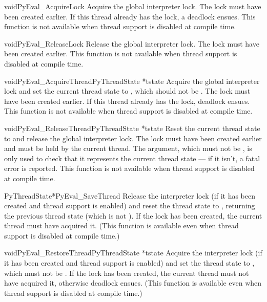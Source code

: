 \begin{cfuncdesc}{void}{PyEval_AcquireLock}{}
  Acquire the global interpreter lock.  The lock must have been
  created earlier.  If this thread already has the lock, a deadlock
  ensues.  This function is not available when thread support is
  disabled at compile time.
\end{cfuncdesc}

\begin{cfuncdesc}{void}{PyEval_ReleaseLock}{}
  Release the global interpreter lock.  The lock must have been
  created earlier.  This function is not available when thread support
  is disabled at compile time.
\end{cfuncdesc}

\begin{cfuncdesc}{void}{PyEval_AcquireThread}{PyThreadState *tstate}
  Acquire the global interpreter lock and set the current thread
  state to , which should not be \NULL.  The lock must
  have been created earlier.  If this thread already has the lock,
  deadlock ensues.  This function is not available when thread support
  is disabled at compile time.
\end{cfuncdesc}

\begin{cfuncdesc}{void}{PyEval_ReleaseThread}{PyThreadState *tstate}
  Reset the current thread state to \NULL{} and release the global
  interpreter lock.  The lock must have been created earlier and must
  be held by the current thread.  The  argument, which
  must not be \NULL, is only used to check that it represents the
  current thread state --- if it isn't, a fatal error is reported.
  This function is not available when thread support is disabled at
  compile time.
\end{cfuncdesc}

\begin{cfuncdesc}{PyThreadState*}{PyEval_SaveThread}{}
  Release the interpreter lock (if it has been created and thread
  support is enabled) and reset the thread state to \NULL, returning
  the previous thread state (which is not \NULL).  If the lock has
  been created, the current thread must have acquired it.  (This
  function is available even when thread support is disabled at
  compile time.)
\end{cfuncdesc}

\begin{cfuncdesc}{void}{PyEval_RestoreThread}{PyThreadState *tstate}
  Acquire the interpreter lock (if it has been created and thread
  support is enabled) and set the thread state to , which
  must not be \NULL.  If the lock has been created, the current thread
  must not have acquired it, otherwise deadlock ensues.  (This
  function is available even when thread support is disabled at
  compile time.)
\end{cfuncdesc}

